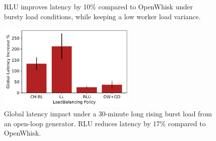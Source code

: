 \begin{figure}
  \centering
  \caption{RLU improves latency by 10\% compared to OpenWhisk under bursty load conditions, while keeping a low worker load variance.}
  \label{fig:bursty-closedload}
\end{figure}




\begin{figure}
  \centering
  \includegraphics[width=0.6\textwidth]{chrlu/faaslb-osdi22/figs/ow/openload/openload-latencies-cntnorm.pdf}
  \caption{Global latency impact under a 30-minute long rising burst load from an open-loop generator. RLU reduces  latency by 17\% compared to OpenWhisk.}
  \label{fig:bursty-openload}
\end{figure}

